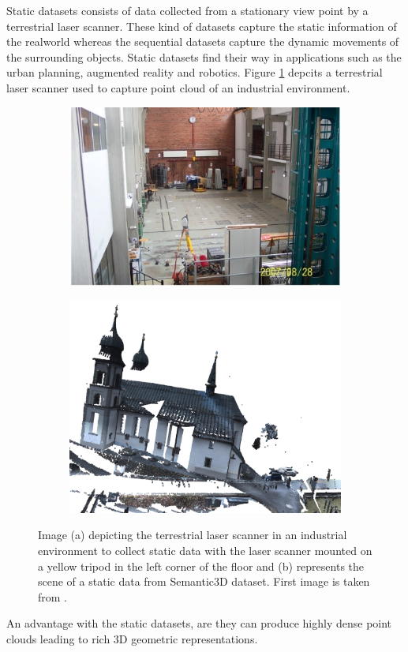     Static datasets consists of data collected from a stationary view point by a terrestrial laser scanner.
    These kind of datasets capture the static information of the realworld whereas the sequential datasets capture the dynamic movements of the surrounding objects.
    Static datasets find their way in applications such as the urban planning, augmented reality and robotics. 
    Figure \ref{fig:tls} depcits a terrestrial laser scanner used to capture point cloud of an industrial environment.
    \begin{figure}[h!]
        \centering
        \begin{subfigure}{0.45\textwidth}
            \includegraphics[scale=0.45]{images/TLS.jpg}
            \caption{}
        \end{subfigure}
        \begin{subfigure}{0.45\textwidth}
            \centering
            \includegraphics[scale=0.2]{images/sem3d_data/1.pdf}
            \caption{}
        \end{subfigure}

        \caption{Image (a) depicting the terrestrial laser scanner in an industrial environment to collect static data with the laser scanner mounted on a yellow tripod in the left corner of the floor and 
        (b) represents the scene of a static data from Semantic3D dataset. First image is taken from \cite{tls}.}
        \label{fig:tls}
    \end{figure}
    An advantage with the static datasets, are they can produce highly dense point clouds leading to rich 3D geometric representations.
    
